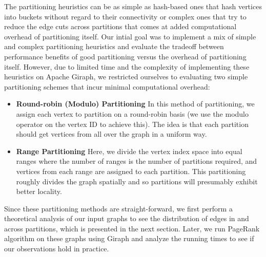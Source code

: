 The partitioning heuristics can be as simple as hash-based ones that hash 
vertices into buckets 
without regard to their connectivity or complex ones that try to reduce the edge cuts across partitions 
\cite{Salihoglu1} that comes at added computational overhead of partitioning itself. Our intial goal 
was to implement a mix of simple and complex partitioning heuristics and evaluate the tradeoff between
performance benefits of good partitioning versus the overhead of partitioning itself. However, due to 
limited time and the complexity of implementing these heuristics on Apache Giraph, we restricted 
ourselves to evaluating two simple partitioning schemes that incur minimal 
computational overhead:
\begin{itemize}
    \item \textbf{Round-robin (Modulo) Partitioning} In this method of 
    partitioning, we assign each vertex to 
    partition on a round-robin basis (we use the modulo operator on the vertex 
    ID to achieve this). The idea 
    is that each partition 
    should get vertices from all over the graph in a uniform way.
    \item \textbf{Range Partitioning} Here, we divide the vertex index space 
    into equal ranges where the number of ranges is the number of partitions 
    required, and vertices from each range are assigned to 
    each partition. This partitioning roughly divides the graph spatially and 
    so partitions will presumably exhibit better locality.
\end{itemize}

Since these partitioning methods are straight-forward, we first perform a theoretical analysis of our 
input graphs to see the distribution of edges in and across partitions, which is presented in the 
next section. Later, we run PageRank 
algorithm on these graphs using Giraph and analyze the running times to see if our observations 
hold in practice.




